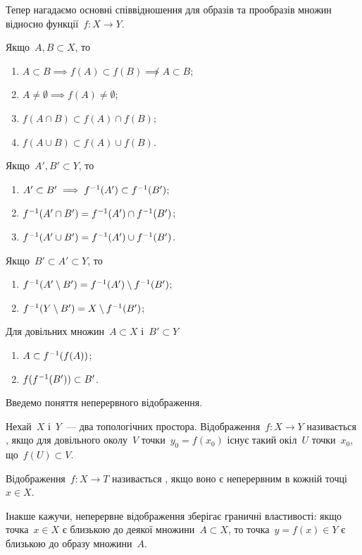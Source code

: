 Тепер нагадаємо основні співвідношення для образів та прообразів множин відносно функції~$f: X \to Y$.

Якщо~$A, B \subset X$, то
\begin{enumerate}
    \item $A \subset B \implies f(A) \subset f(B) \not\implies A \subset B$;
    \item $A \ne \emptyset \implies f(A) \ne \emptyset$;
    \item $f(A \cap B) \subset f(A) \cap f(B)$;
    \item $f(A \cup B) \subset f(A) \cup f(B)$.
\end{enumerate}
Якщо~$A', B' \subset Y$, то
\begin{enumerate}
    \item $A' \subset B' \implies f^{-1}(A') \subset f^{-1}(B')$;
    \item $f^{-1}(A' \cap B') = f^{-1}(A') \cap f^{-1}(B')$;
    \item $f^{-1}(A' \cup B') = f^{-1}(A') \cup f^{-1}(B')$.
\end{enumerate}
Якщо~$B' \subset A' \subset Y$, то
\begin{enumerate}
    \item $f^{-1}(A' \setminus B') = f^{-1}(A') \setminus f^{-1}(B')$;
    \item $f^{-1}(Y \setminus B') = X \setminus f^{-1}(B')$;
\end{enumerate}
Для довільних множин~$A \subset X$ і~$B' \subset Y$
\begin{enumerate}
    \item $A \subset f^{-1}(f(A))$;
    \item $f(f^{-1}(B')) \subset B'$.
\end{enumerate}

Введемо поняття неперервного відображення.

\begin{definition}
    Нехай~$X$ і~$Y$~--- два топологічних простора. Відображення~$f: X \to Y$ називається , якщо для довільного околу~$V$ точки~$y_0 = f(x_0)$ існує такий окіл~$U$ точки~$x_0$, що~$f(U) \subset V$.
\end{definition}

\begin{definition}
    Відображення~$f: X \to T$ називається , якщо воно є неперервним в кожній точці~$x \in X$.
\end{definition}

Інакше кажучи, неперервне відображення зберігає граничні властивості: якщо точка~$x \in X$ є близькою до деякої множини~$A \subset X$, то точка~$y = f(x) \in Y$ є близькою до образу множини~$A$.

